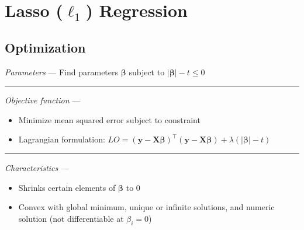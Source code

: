 \section{Lasso ($\ell_1$) Regression}
\subsection*{Optimization}
\emph{Parameters} --- Find parameters $\boldsymbol{\beta}$ subject to $|\boldsymbol{\beta}| - t \leq 0$

{\color{lightgray}\hrule height 0.001mm}

\emph{Objective function} --- 
\begin{itemize}
    \item Minimize mean squared error subject to constraint
    \item Lagrangian formulation: $LO = ( \boldsymbol{y} - \boldsymbol{X}\boldsymbol{\beta})^\intercal( \boldsymbol{y} - \boldsymbol{X}\boldsymbol{\beta} ) + \lambda ( |\boldsymbol{\beta}| - t )$
\end{itemize}

{\color{lightgray}\hrule height 0.001mm}

\emph{Characteristics} ---
\begin{itemize}
    \item Shrinks certain elements of $\boldsymbol{\beta}$ to 0
    \item Convex with global minimum, unique or infinite solutions, and numeric solution (not differentiable at $\beta_i = 0$)
\end{itemize}